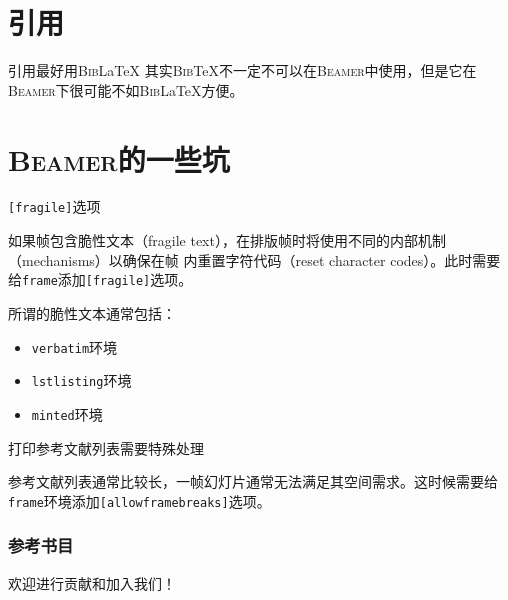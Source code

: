 \documentclass[aspectratio=169]{beamer}
\newcommand{\BibTeX}{\textsc{Bib}\TeX{}}
\newcommand{\BibLaTeX}{\textsc{Bib}\LaTeX{}}
\newcommand{\Beamer}{\textsc{Beamer}}
\newcommand{\enableindent}{\setlength{\parskip}{6pt}\setlength{\parindent}{2em}}
\begin{document}
\section{引用}

\begin{frame}{引用最好用\BibLaTeX{}}
	其实\BibTeX{}不一定不可以在\Beamer{}中使用，但是它在\Beamer{}下很可能不如\BibLaTeX{}方便。
\end{frame}

\section{\Beamer{}的一些坑}

\begin{frame}{\texttt{[fragile]}选项}
	\enableindent

	如果帧包含脆性文本（fragile text），在排版帧时将使用不同的内部机制（mechanisms）以确保在帧
内重置字符代码（reset character codes）。此时需要给\texttt{frame}添加\texttt{[fragile]}选项。

	所谓的脆性文本通常包括：
	\begin{itemize}
		\item \texttt{verbatim}环境
		\item \texttt{lstlisting}环境
  		\item \texttt{minted}环境
	\end{itemize}
\end{frame}

\begin{frame}{打印参考文献列表需要特殊处理}
	
	参考文献列表通常比较长，一帧幻灯片通常无法满足其空间需求。这时候需要给\texttt{frame}环境添加\texttt{[allowframebreaks]}选项。
\end{frame}

\begin{frame}[allowframebreaks]
\frametitle{参考书目}
{
	\tiny
	\nocite{*}
	\printbibliography[heading=none]
}
\end{frame}

\begin{frame}
	欢迎进行贡献和加入我们！
\end{frame}
\end{document}
